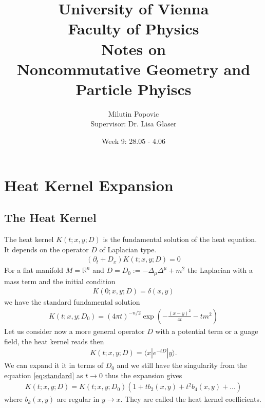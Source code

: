 \documentclass[a4paper]{article}
\title{University of Vienna\\ Faculty of Physics\\ \vspace{1.25cm}
Notes on\\ Noncommutative Geometry and Particle Phyiscs}
\author{Milutin Popovic \\ Supervisor: Dr. Lisa
Glaser}
\date{Week 9: 28.05 - 4.06}
\theoremstyle{definition}
\theoremstyle{definition}
\theoremstyle{definition}
\theoremstyle{theorem}
\theoremstyle{theorem}
\theoremstyle{theorem}
\begin{document}
    \maketitle
    \tableofcontents
    \newpage

\section{Heat Kernel Expansion}
\subsection{The Heat Kernel}
The heat kernel $K(t; x, y; D)$ is the fundamental solution of the heat
equation. It depends on the operator $D$ of Laplacian type.
\begin{align}
    (\partial _t + D_x)K(t;x, y;D) =0
\end{align}
For a flat manifold $M = \mathbb{R}^n$ and $D = D_0 := -\Delta_\mu\Delta^\mu +m^2$ the
Laplacian with a mass term and the initial condition
\begin{align}
    K(0;x,y;D) = \delta(x,y)
\end{align}
we have the standard fundamental solution
\begin{align}\label{eq:standard}
    K(t;x,y;D_0) = (4\pi t)^{-n/2}\exp\left(-\frac{(x-y)^2}{4t}-tm^2\right)
\end{align}
Let us consider now a more general operator $D$ with a potential term or a
guage field, the heat kernel reads then
\begin{align}
    K(t;x,y;D) = \langle x|e^{-tD}|y\rangle.
\end{align}
We can expand it it in terms of $D_0$ and we still have the
singularity from the equation \ref{eq:standard} as $t\rightarrow 0$ thus the
expansion gives
\begin{align}
    K(t;x,y;D) = K(t;x,y;D_0)\left(1 + tb_2(x,y) + t^2b_4(x,y) + \dots \right)
\end{align}
where $b_k(x,y)$ are regular in $y \rightarrow x$. They are called the heat
kernel coefficients.
\end{document}
